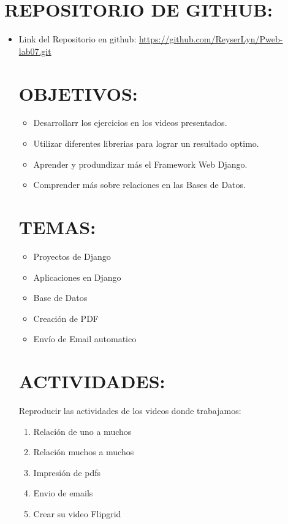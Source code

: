 \documentclass{article}
\begin{document}
	\section{REPOSITORIO DE GITHUB:}
	\begin{itemize}		
		\item Link del Repositorio en github: \url{https://github.com/ReyserLyn/Pweb-lab07.git}
		
		\section{OBJETIVOS:}
		\begin{itemize}		
			\item Desarrollarr los ejercicios en los videos presentados.
			\item Utilizar diferentes librerias para lograr un resultado optimo.
			\item Aprender y produndizar más el Framework Web Django.
			\item Comprender más sobre relaciones en las Bases de Datos.
			
		\end{itemize}
		
		\section{TEMAS:}
		\begin{itemize}		
			\item  Proyectos de Django
			\item Aplicaciones en Django
			\item Base de Datos
			\item Creación de PDF
			\item Envío de Email automatico
		\end{itemize}
		
		
		\section{ACTIVIDADES:}
		Reproducir las actividades de los videos donde trabajamos:
		
		\begin{enumerate}
			\item Relación de uno a muchos
			\item Relación muchos a muchos
			\item Impresión de pdfs
			\item Envio de emails
			\item Crear su video Flipgrid
			
		\end{enumerate}
		
		
	\end{itemize}
	
\end{document}
